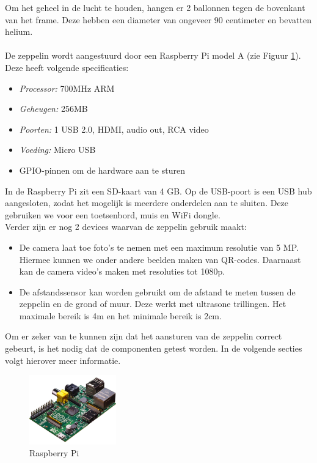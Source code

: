 \documentclass[tt]{penoverslag}
\begin{document}
Om het geheel in de lucht te houden, hangen er 2 ballonnen tegen de bovenkant van het frame. Deze hebben een diameter van ongeveer 90 centimeter en bevatten helium. \\
\\
De zeppelin wordt aangestuurd door een Raspberry Pi model A (zie Figuur \ref{Pi}). Deze heeft volgende specificaties: 
\begin{itemize}
	\item \emph{Processor:} 700MHz ARM
	\item \emph{Geheugen:} 256MB 
	\item \emph{Poorten:} 1 USB 2.0, HDMI, audio out, RCA video
	\item \emph{Voeding:} Micro USB
	\item GPIO-pinnen om de hardware aan te sturen
\end{itemize}

In de Raspberry Pi zit een SD-kaart van 4 GB. Op de USB-poort is een USB hub aangesloten, zodat het mogelijk is meerdere onderdelen aan te sluiten. Deze gebruiken we voor een toetsenbord, muis en WiFi dongle. \\

Verder zijn er nog 2 devices waarvan de zeppelin gebruik maakt:
\begin{itemize}
	\item De camera laat toe foto's te nemen met een maximum resolutie van 5 MP. Hiermee kunnen we onder andere beelden maken van QR-codes. Daarnaast kan de camera video's maken met resoluties tot 1080p. 
	\item De afstandssensor kan worden gebruikt om de afstand te meten tussen de zeppelin en de grond of muur. Deze werkt met ultrasone trillingen. Het maximale bereik is 4m en het minimale bereik is 2cm.\\
\end{itemize}

Om er zeker van te kunnen zijn dat het aansturen van de zeppelin correct gebeurt, is het nodig dat de componenten getest worden. In de volgende secties volgt hierover meer informatie.\\

\begin{figure}[ht!]
\centering
\includegraphics[height=30mm]{raspb.jpg}
\caption{Raspberry Pi}
\label{Pi}
\end{figure}
\end{document}
